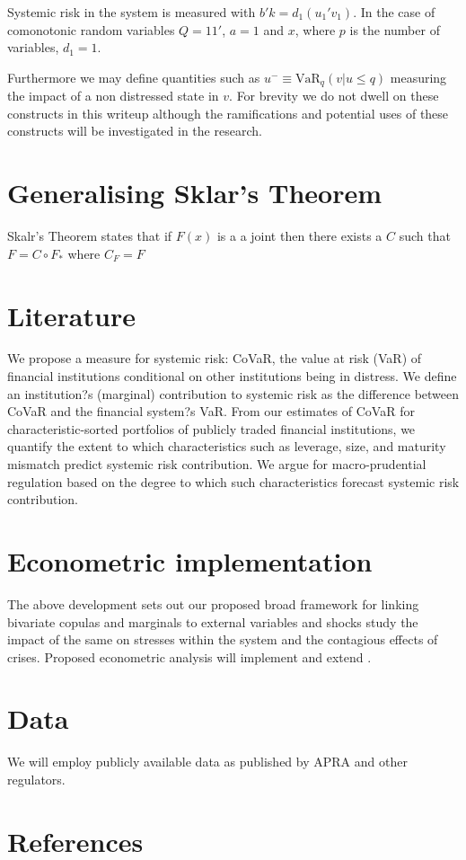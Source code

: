 \documentclass[authoryear]{elsarticle}
\newcommand{\var}{\ensuremath{\mathrm{VaR}}}
\begin{document}
Systemic risk in the system is measured with $b'k=d_1(u_1'v_1)$.   In the case of comonotonic  random variables $Q=11'$, $a=1$ and $x$, where $p$ is the number of variables,  $d_1=1$. 
 
Furthermore we may define quantities such as
$
u^- \equiv \var_q(v|u\le q)
$
measuring the impact of a non distressed state in $v$.  For brevity we do not dwell on these constructs in this writeup although the ramifications and potential uses of these constructs will be  investigated in the research.

\section{Generalising Sklar's Theorem}

Skalr's Theorem states that if $F(x)$ is a a joint then there exists a $C$ such that
$
F=C\circ F_*
$ where $C_F=F$
\section{Literature}

We propose a measure for systemic risk: CoVaR, the value at risk (VaR) of financial institutions conditional on other institutions being in distress. We define an institution?s (marginal) contribution to systemic risk as the difference between CoVaR and the financial system?s VaR. From our estimates of CoVaR for characteristic-sorted portfolios of publicly traded financial institutions, we quantify the extent to which characteristics such as leverage, size, and maturity mismatch predict systemic risk contribution. We argue for macro-prudential regulation based on the degree to which such characteristics forecast systemic risk contribution.

\section{Econometric implementation}

The above development sets out our proposed  broad  framework for linking bivariate copulas and marginals to external variables and shocks study the impact of the same on stresses within the system and the contagious effects of crises.   Proposed econometric analysis will implement and extend  \cite{brownlees2010volatility}.

\section{Data}

We will employ publicly available data as published by APRA and other regulators.

\section*{References}

\end{document}
